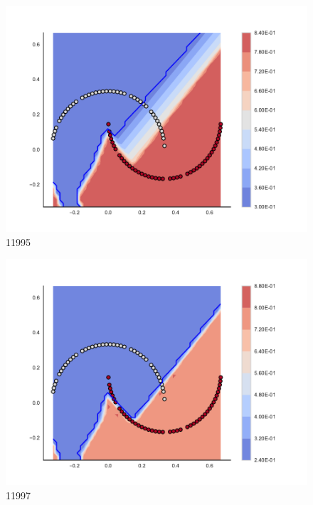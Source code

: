 \begin{subfigure}[b]{0.09\textwidth}
    \includegraphics[clip, trim=2.35cm 1.75cm 4.5cm 0cm,width=\textwidth]{img/convergence/11995.pdf}
    \caption{11995}
    \label{fig:convergence_11995}
\end{subfigure}
%
\begin{subfigure}[b]{0.09\textwidth}
    \includegraphics[clip, trim=2.35cm 1.75cm 4.5cm 0cm,width=\textwidth]{img/convergence/11997.pdf}
    \caption{11997}
    \label{fig:convergence_11997}
\end{subfigure}
%
